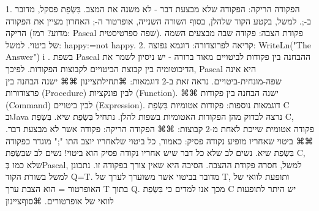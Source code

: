         1. הפקודה הריקה: הפקודה שלא מבצעת דבר - לא משנה את המצב. בִּשְׂפַת פסקל, מדובר ב-;. למשל, בקטע הקוד שלהלן, בסוף השורה השנייה, אופרטור ה-; האחרון מציין את הפקודה הריקה (מדוע? רמז: Pascal שפה ספרטיסטית). פקודת הצבה: פקודה שבה מבצעים השמה של ביטוי. למשל: happy:=not happy.
        2. קריאה לפרוצדורה: דוגמא נפוצה: WriteLn("The Answer") i .
        בשפת Pascal ההבחנה בין פקודות לביטויים מאוד ברורה - יש ניסיון לשמר את הדיכוטומיה בין קבוצת הביטויים לקבוצות הפקודות. לפיכך, Pascal היא אינה שפה-מונחית-ביטויים. נראה זאת ב-2 דוגמאות:
        ⌘תחילת{ציינון}
        ⌘⌘ ישנה הבחנה בין פרצודורות (Procedure) לבין פונקציות (Function).
        ⌘⌘ ישנה הבחנה בין פקודות (Command) לבין ביטויים (Expression).
        דוגמאות נוספות: פקודות אטומיות בִּשְׂפַת C ובJava
        נרצה לבדוק מהן הפקודות האטומיות בשפות להלן. נתחיל בִּשְׂפַת שיא.
        בִּשְׂפַת C, פקודה אטומית שייכת לאחת מ-2 קבוצות:
        ⌘⌘ הפקודה הריקה: פקודה אשר לא מבצעת דבר.
        ⌘⌘ ביטוי שאחריו מופיע נקודה פסיק: כאמור, כל ביטוי שלאחריו יוצב התו ";" מוגדר כפקודה בִּשְׂפַת שיא. נשים לב שלא כל דבר שיש אחריו נקודה פסיק הוא ביטוי!
        נשים לב שבִּשְׂפַת C, שלא כמו בְּPascal, למשל, חסרה פקודת ההצבה. הסיבה היא שאין צורך בפקודה זו. נתבונן למשל בשורת הקוד Q=T. מדובר בביטוי אשר משוערך לערך של T, ותופעת לוואי של האופרטור = הוא הצבת ערך T בתוך Q. מכך אנו למדים כי בִּשְׂפַת C יש היתר לתופעות לוואי של אופרטורים.
    ⌘סוף{ציינון}

